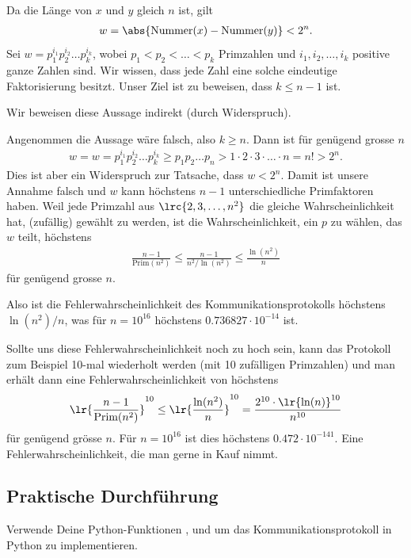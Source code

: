 \begin{aenum}
		Da die Länge von $x$ und $y$ gleich $n$ ist, gilt
		\begin{align*}
			w = \abs{\text{Nummer}(x)-\text{Nummer}(y)} < 2^n.
		\end{align*}
		Sei $w = p_1^{i_1}p_2^{i_2}\ldots p_k^{i_k}$, wobei $p_1<p_2<\ldots<p_k$ Primzahlen  und $i_1, i_2,\ldots ,i_k$ positive ganze Zahlen sind. Wir wissen, dass jede Zahl eine solche eindeutige Faktorisierung besitzt. Unser Ziel ist zu beweisen, dass $k\leq n-1$ ist.

		Wir beweisen diese Aussage indirekt (durch Widerspruch).

		Angenommen die Aussage wäre falsch, also $k\geq n$. Dann ist für genügend grosse $n$
		\begin{align*}
			w = w = p_1^{i_1}p_2^{i_2}\ldots p_k^{i_k} \geq p_1p_2\ldots p_n > 1\cdot 2\cdot 3\cdot \ldots \cdot n = n! > 2^n.
		\end{align*}
		Dies ist aber ein Widerspruch zur Tatsache, dass $w < 2^n$. Damit ist unsere Annahme falsch und $w$ kann höchstens $n-1$ unterschiedliche Primfaktoren haben. Weil jede Primzahl aus $\lrc{2,3,\ldots ,n^2}$ die gleiche Wahrscheinlichkeit hat, (zufällig) gewählt zu werden, ist die Wahrscheinlichkeit, ein $p$ zu wählen, das $w$ teilt, höchstens
		\begin{align*}
			\frac{n-1}{\text{Prim}(n^2)}\leq \frac{n-1}{n^2/\ln(n^2)}\leq\frac{\ln(n^2)}{n}
		\end{align*}
		für genügend grosse $n$.

		Also ist die Fehlerwahrscheinlichkeit des Kommunikationsprotokolls höchstens $\ln(n^2)/n$, was für $n=10^{16}$ höchstens $0.736827\cdot 10^{-14}$ ist.
	\end{aenum}
	Sollte uns diese Fehlerwahrscheinlichkeit noch zu hoch sein, kann das Protokoll zum Beispiel 10-mal wiederholt werden (mit 10 zufälligen Primzahlen) und man erhält dann eine Fehlerwahrscheinlichkeit von höchstens
	\begin{align*}
		\lr{\frac{n-1}{\text{Prim}(n^2)}}^{10}\leq \lr{\frac{\ln(n^2)}{n}}^{10} = \frac{2^{10}\cdot \lr{\ln(n)}^{10}}{n^{10}}
	\end{align*}
	für genügend grösse $n$. Für $n = 10^{16}$ ist dies höchstens $0.472\cdot 10^{-141}$. Eine Fehlerwahrscheinlichkeit, die man gerne in Kauf nimmt.

\subsection{Praktische Durchführung}
\begin{myexercise}\label{myexercise:protokoll}
	Verwende Deine Python-Funktionen ,  und  um das Kommunikationsprotokoll in Python zu implementieren.
\end{myexercise}

